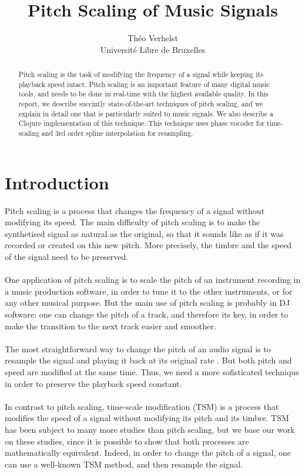 \documentclass[letterpaper]{article}
\title{Pitch Scaling of Music Signals}
\author{Théo Verhelst \\
Université Libre de Bruxelles}
\begin{document}
\maketitle

\begin{abstract}
Pitch scaling is the task of modifying the frequency of a signal while keeping
its playback speed intact. Pitch scaling is an important feature of many digital
music tools, and needs to be done in real-time with the highest available
quality. In this report, we describe succintly state-of-the-art techniques of
pitch scaling, and we explain in detail one that is particularly suited to music
signals. We also describe a Clojure implementation of this technique. This
technique uses phase vocoder for time-scaling and 3rd order spline interpolation
for resampling.
\end{abstract}

\section{Introduction}
Pitch scaling is a process that changes the frequency of a signal without
modifying its speed. The main difficulty of pitch scaling is to make the
synthetised signal as natural as the original, so that it sounds like as if it
was recorded or created on this new pitch. More precisely, the timbre and the
speed of the signal need to be preserved.
\paragraph{}
One application of pitch scaling is to scale the pitch of an instrument
recording in a music production software, in order to tune it to the other
instruments, or for any other musical purpose. But the main use of pitch scaling
is probably in DJ software: one can change the pitch of a track, and therefore
its key, in order to make the transition to the next track easier and smoother.
\paragraph{}
The most straightforward way to change the pitch of an audio signal is to
resample the signal and playing it back at its original rate \citep{DM}. But
both pitch and speed are modified at the same time. Thus, we need a more
sofisticated technique in order to preserve the playback speed constant.
\paragraph{}
In contrast to pitch scaling, time-scale modification (TSM) is a process that
modifies the speed of a signal without modifying its pitch and its timbre.
TSM has been subject to many more studies than pitch scaling, but we base our
work on these studies, since it is possible to show that both processes are
mathematically equivalent. Indeed, in order to change the pitch of a signal, one
can use a well-known TSM method, and then resample the signal.
\end{document}
